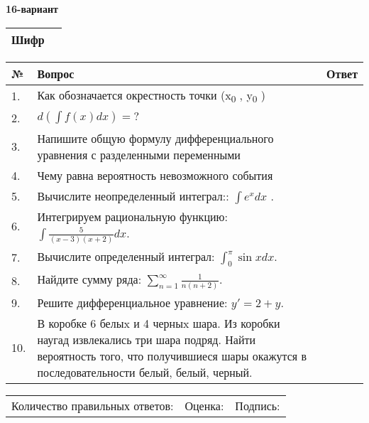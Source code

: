 \documentclass{article}
\begin{document}
  \egroup
  
  \newpage
  
  
  \textbf{16-вариант}\\
  
  \bgroup
  \def\arraystretch{1.6} %
  
  \begin{tabular}{|m{5.7cm}|m{9.5cm}|}
  \hline
  Шифр & \\
  \hline
  \end{tabular}
  
  \vspace{1cm}
  
  \begin{tabular}{|m{0.7cm}|m{10cm}|m{4cm}|}
  \hline
  № & Вопрос & Ответ \\
  \hline
  1. & Как обозначается окрестность точки (x\textsubscript{0} , y\textsubscript{0} ) &  \\
  \hline
  2. & \(d\left( \int{f(x)dx} \right) = ?\) &  \\
  \hline
  3. & Напишите общую формулу дифференциального уравнения с разделенными переменными &  \\
  \hline
  4. & Чему равна вероятность невозможного события &  \\
  \hline
  5. & Вычислите неопределенный интеграл:: \(\int{e^{x}dx}\) . &  \\
  \hline
  6. & Интегрируем рациональную функцию: \(\int{\frac{5}{(x - 3)(x + 2)}dx}\). &  \\
  \hline
  7. & Вычислите определенный интеграл: \(\int_{0}^{\pi}{\sin xdx}\). &  \\
  \hline
  8. & Найдите сумму ряда: \(\sum_{n = 1}^{\infty}\frac{1}{n(n + 2)}\). &  \\
  \hline
  9. & Решите дифференциальное уравнение: \(y' = 2 + y\). &  \\
  \hline
  10. & В коробке 6 белыx и 4 черныx шара. Из коробки наугад извлекались три шара подряд. Найти вероятность того, что получившиеся шары окажутся в последовательности белый, белый, черный. &  \\
  \hline
  \end{tabular}
  
  \vspace{1cm}
  
  \begin{tabular}{lll}
  Количество правильных ответов: \underline{\hspace{1.5cm}} & 
  Оценка: \underline{\hspace{1.5cm}} & 
  Подпись: \underline{\hspace{2cm}} \\
  \end{tabular}
  
\end{document}
